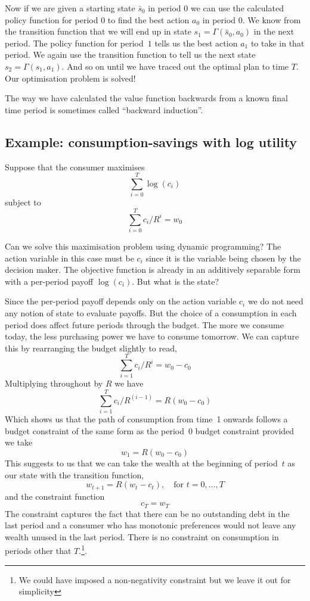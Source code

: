 \documentclass[12pt,reqno]{amsart}
\begin{document}
Now if we are given a starting state $\bar s_0$ in period $0$ we can
use the calculated policy function for period $0$ to find the best
action $a_0$ in period 0. We know from the transition function that we
will end up in state $s_1=\Gamma(\bar s_0,a_0)$ in the next
period. The policy function for period~$1$ tells us the best action
$a_1$ to take in that period. We again use the transition function to
tell us the next state $s_2=\Gamma(s_1,a_1)$. And so on until we have
traced out the optimal plan to time $T$. Our optimisation problem is
solved! 

The way we have calculated the value function backwards from a
known final time period is sometimes called ``backward induction''.

\subsection{Example: consumption-savings with log utility}
Suppose that the consumer maximises
\[\sum_{i=0}^T \log(c_i)\]
subject to
\[\sum_{i=0}^T c_i/R^i=w_0\]

Can we solve this maximisation problem using dynamic programming? The
action variable in this case must be $c_i$ since it is the variable
being chosen by the decision maker. The
objective function is already in an additively separable form with a
per-period payoff $\log(c_i)$. But what is the state?

Since the per-period payoff depends only on the action variable $c_i$
we do not need any notion of state to evaluate payoffs. But the choice
of a consumption in each period does affect future periods through the
budget. The more we consume today, the less purchasing power we have
to consume tomorrow. We can capture this by rearranging the budget
slightly to read,
\[\sum_{i=1}^T c_i/R^i = w_0-c_0\]
Multiplying throughout by $R$ we have
\[\sum_{i=1}^T c_i/R^{(i-1)} = R(w_0-c_0)\]
Which shows us that the path of consumption from time~1 onwards
follows a budget constraint of the same form as the period~0 budget
constraint provided we take
\[w_1=R(w_0-c_0)\]
This suggests to us that we can take the wealth at the beginning of
period~$t$ as our state with the transition function,
\[w_{t+1}=R(w_t-c_t),\quad \text{for $t=0,\ldots,T$}\]
and the constraint function
\[c_T = w_T\]
The constraint captures the fact that there can be no outstanding debt
in the last period and a consumer who has monotonic preferences would
not leave any wealth unused in the last period. There is no constraint
on consumption in periods other that $T$.\footnote{We could have
  imposed a non-negativity constraint but we leave it out for simplicity}.
\end{document}
